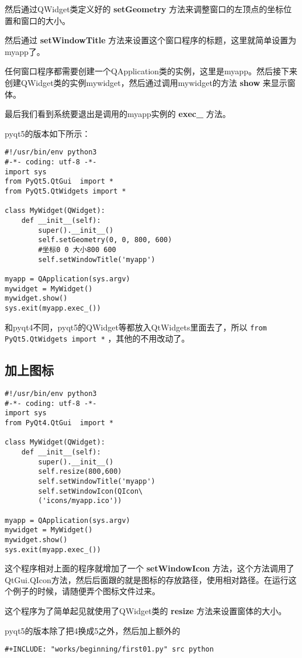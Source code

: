 \documentclass[11pt,oneside]{article}
\begin{document}
然后通过QWidget类定义好的 \textbf{setGeometry} 方法来调整窗口的左顶点的坐标位置和窗口的大小。

然后通过 \textbf{setWindowTitle} 方法来设置这个窗口程序的标题，这里就简单设置为myapp了。

任何窗口程序都需要创建一个QApplication类的实例，这里是myapp。然后接下来创建QWidget类的实例mywidget，然后通过调用mywidget的方法 \textbf{show} 来显示窗体。

最后我们看到系统要退出是调用的myapp实例的 \textbf{exec\_} 方法。

pyqt5的版本如下所示：
\begin{verbatim}
#!/usr/bin/env python3
#-*- coding: utf-8 -*-
import sys
from PyQt5.QtGui  import *
from PyQt5.QtWidgets import *

class MyWidget(QWidget):
    def __init__(self):
        super().__init__()
        self.setGeometry(0, 0, 800, 600)
        #坐标0 0 大小800 600
        self.setWindowTitle('myapp')

myapp = QApplication(sys.argv)
mywidget = MyWidget()
mywidget.show()
sys.exit(myapp.exec_())
\end{verbatim}

和pyqt4不同，pyqt5的QWidget等都放入QtWidgets里面去了，所以 \texttt{from PyQt5.QtWidgets import *} ，其他的不用改动了。


\subsection{加上图标}
\label{sec:orgheadline6}
\begin{verbatim}
#!/usr/bin/env python3
#-*- coding: utf-8 -*-
import sys
from PyQt4.QtGui  import *

class MyWidget(QWidget):
    def __init__(self):
        super().__init__()
        self.resize(800,600)
        self.setWindowTitle('myapp')
        self.setWindowIcon(QIcon\
        ('icons/myapp.ico'))

myapp = QApplication(sys.argv)
mywidget = MyWidget()
mywidget.show()
sys.exit(myapp.exec_())
\end{verbatim}

这个程序相对上面的程序就增加了一个 \textbf{setWindowIcon} 方法，这个方法调用了QtGui.QIcon方法，然后后面跟的就是图标的存放路径，使用相对路径。在运行这个例子的时候，请随便弄个图标文件过来。

这个程序为了简单起见就使用了QWidget类的 \textbf{resize} 方法来设置窗体的大小。

pyqt5的版本除了把4换成5之外，然后加上额外的
\begin{Verbatim}
#+INCLUDE: "works/beginning/first01.py" src python
\end{Verbatim}
\end{document}
